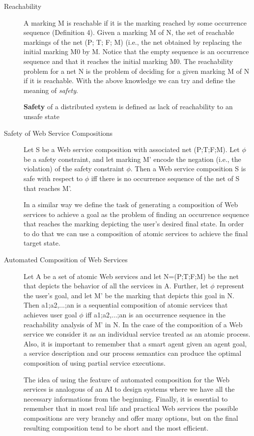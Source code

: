 \begin{description}
\item[Reachability] A marking M is reachable if it is the marking reached by some occurrence sequence (Definition 4). Given a marking M of N, the set of reachable markings of the net (P; T; F; M) (i.e., the net obtained by replacing the initial marking M0 by M. Notice that the empty sequence is an occurrence sequence and that it reaches the initial marking M0. The reachability problem for a net N is the problem of deciding for a given marking M of N if it is reachable. With the above knowledge we can try and define the meaning of \emph{safety}.

\textbf{Safety} of a distributed system is defined as lack of reachability to an unsafe state

\item[Safety of Web Service Compositions] Let S be a Web service composition with associated net (P;T;F;M). Let $\phi$ be a safety constraint, and let marking M’ encode the negation (i.e., the violation) of the safety constraint $\phi$. Then a Web service composition S is safe with respect to $\phi$ iff there is no occurrence sequence of the net of S that reaches M’.

In a similar way we define the task of generating a composition of Web services to achieve a goal as the problem of finding an occurrence sequence that reaches the marking depicting the user's desired final state. In order to do that we can use a composition of atomic services to achieve the final target state.

\item[Automated Composition of Web Services] Let A be a set of atomic Web services and let N=(P;T;F;M) be the net that depicts the behavior of all the services in A. Further, let $\phi$ represent the user’s goal, and let M’ be the marking that depicts this goal in N. Then a1;a2,...;an is a sequential composition of atomic services that achieves user goal $\phi$ iff a1;a2,...;an is an occurrence sequence in the reachability analysis of M’ in N. In the case of the composition of a Web service we consider it as an individual service treated as an atomic process. Also, it is important to remember that a smart agent given an agent goal, a service description and our process semantics can produce the optimal composition of using partial service executions.

The idea of using the feature of automated composition for the Web services is analogous of an AI to design systems where we have all the necessary informations from the beginning. Finally, it is essential to remember that in most real life and practical Web services the possible compositions are very branchy and offer many options, but on the final resulting composition tend to be short and the most efficient.
\end{description}

